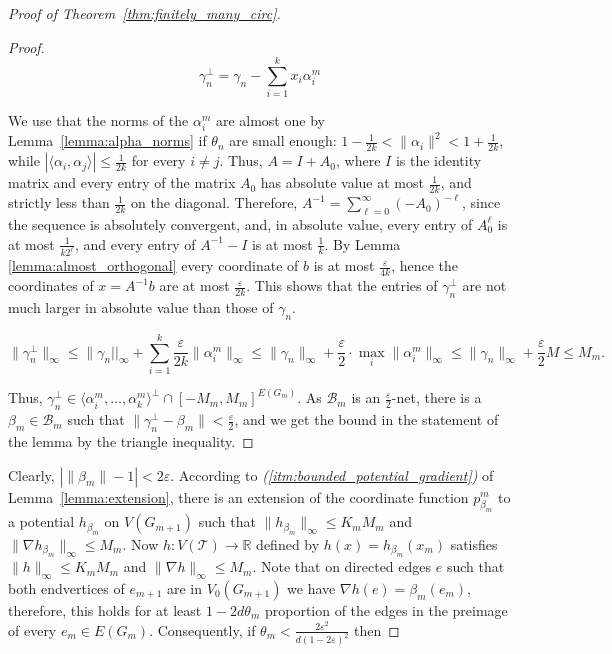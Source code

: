\documentclass[10pt]{article}
\theoremstyle{plain}
\theoremstyle{remark}
\newcommand{\1}{\mathbbm{1}}
\newcommand{\mcT}{\mathcal{T}}
\numberwithin{equation}{section}
\begin{document}
\begin{proof}[Proof of Theorem~\ref{thm:finitely_many_circ}]
\begin{proof}
\begin{equation} \label{eqn:gamma_prime}
\gamma^{\perp}_n=\gamma_n-\sum_{i=1}^k x_i \alpha_i^m
\end{equation}

We use that the norms of the $\alpha_i^m$ are almost one by Lemma~\ref{lemma:alpha_norms} if $\theta_n$ are small enough: $1 - \frac{1}{2k} < \|\alpha_i\|^2 < 1 + \frac{1}{2k}$, while $|\langle \alpha_i, \alpha_j \rangle | \leq \frac{1}{2k}$ for every $i \neq j$. Thus, $A=I+A_0$, where $I$ is the identity matrix and every entry of the matrix $A_0$ has absolute value at most $\frac{1}{2k}$, and strictly less than $\frac{1}{2k}$ on the diagonal.
Therefore, $A^{-1}=\sum_{\ell=0}^{\infty}(-A_0)^{-\ell}$, since the sequence is absolutely convergent, and, in absolute value, every entry of $A_0^{\ell}$ is at most $\frac{1}{k2^{\ell}}$, and every entry of $A^{-1}-I$ is at most $\frac{1}{k}$. By Lemma \ref{lemma:almost_orthogonal} every coordinate of $b$ is at most $\frac{\varepsilon}{4k}$, hence the coordinates of $x=A^{-1}b$ are at most $\frac{\varepsilon}{2k}$. 
This shows that the entries of $\gamma^{\perp}_n$ are not much larger in absolute value than those of $\gamma_n$.

    \[\|\gamma^{\perp}_n\|_{\infty} \leq \|\gamma_n| |_{\infty} + \sum_{i=1}^k \frac{\varepsilon}{2k} \|\alpha_i^m\|_{\infty} \leq \|\gamma_n \|_{\infty} + \frac{\varepsilon}{2} \cdot \max_{i} \| \alpha_i^m \|_{\infty} \leq \|\gamma_n \|_{\infty} + \frac{\varepsilon}{2} M \leq  M_m.\]

Thus, $\gamma_n^{\perp} \in \langle\alpha_i^m,\ldots, \alpha_k^m\rangle^{\perp} \cap [-M_m, M_m]^{E(G_m)}$. As $\mathcal{B}_m$ is an $\frac{\varepsilon}{2}$-net, there is a $\beta_m \in \mathcal{B}_m$ such that $\|\gamma^{\perp}_n - \beta_m\| < \frac{\varepsilon}{2}$, and we get the bound in the statement of the lemma by the triangle inequality. 
\end{proof}

Clearly, $|\|\beta_m\|-1| < 2\varepsilon$. According to {\it (\ref{itm:bounded_potential_gradient})} of Lemma~\ref{lemma:extension}, there is an extension of the coordinate function $p^{m}_{\beta_m}$ to a potential $h_{\beta_{m}}$ on $V(G_{m+1})$ such that $\|h_{\beta_{m}}\|_{\infty} \leq K_m M_m$ and $\| \nabla h_{\beta_{m}} \|_{\infty} \leq M_m$. Now $h:V(\mcT) \to \mathbb{R}$ defined by $h(x)=h_{\beta_m}(x_m)$ satisfies $\|h\|_{\infty} \leq K_m M_m$ and $\| \nabla h \|_{\infty} \leq M_m$. Note that on directed edges $e$ such that both endvertices of $e_{m+1}$ are in $V_0(G_{m+1})$ we have $\nabla h(e) = \beta_m(e_m)$, therefore, this holds for at least $1-2d\theta_m$ proportion of the edges in the preimage of every $e_m \in E(G_m)$. 
Consequently, if $\theta_m<\frac{2\varepsilon^2}{d(1-2\varepsilon)^2}$ then



\end{proof}
\end{document}
